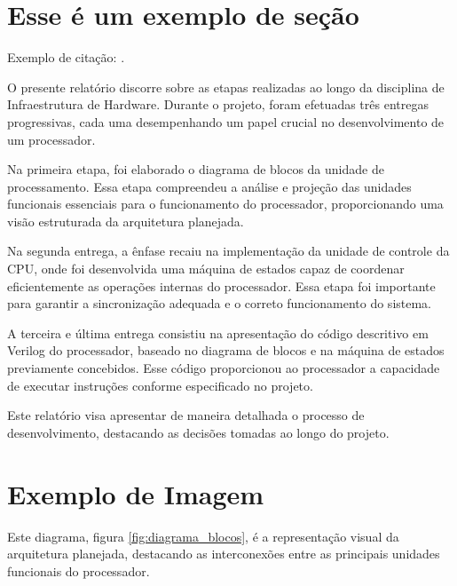 \section{Esse é um exemplo de seção}

Exemplo de citação: \cite{arquiteturaDeComputadores}.

O presente relatório discorre sobre as etapas realizadas ao longo da disciplina de Infraestrutura de Hardware. Durante o projeto, foram efetuadas três entregas progressivas, cada uma desempenhando um papel crucial no desenvolvimento de um processador.

Na primeira etapa, foi elaborado o diagrama de blocos da unidade de processamento. Essa etapa compreendeu a análise e projeção das unidades funcionais essenciais para o funcionamento do processador, proporcionando uma visão estruturada da arquitetura planejada.

Na segunda entrega, a ênfase recaiu na implementação da unidade de controle da CPU, onde foi desenvolvida uma máquina de estados capaz de coordenar eficientemente as operações internas do processador. Essa etapa foi importante para garantir a sincronização adequada e o correto funcionamento do sistema.

A terceira e última entrega consistiu na apresentação do código descritivo em Verilog do processador, baseado no diagrama de blocos e na máquina de estados previamente concebidos. Esse código proporcionou ao processador a capacidade de executar instruções conforme especificado no projeto.

Este relatório visa apresentar de maneira detalhada o processo de desenvolvimento, destacando as decisões tomadas ao longo do projeto.

\newpage

\section{Exemplo de Imagem}

Este diagrama, figura \ref{fig:diagrama_blocos}, é a representação visual da arquitetura planejada, destacando as interconexões entre as principais unidades funcionais do processador.

